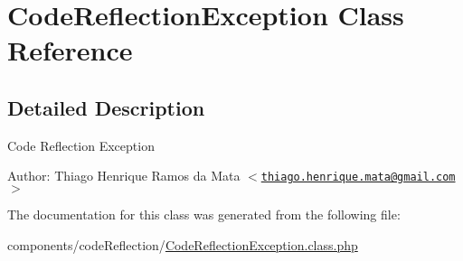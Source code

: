 \hypertarget{class_code_reflection_exception}{
\section{CodeReflectionException Class Reference}
\label{class_code_reflection_exception}
}


\subsection{Detailed Description}
Code Reflection Exception

\begin{Desc}
\item[Author:]Thiago Henrique Ramos da Mata $<$\href{mailto:thiago.henrique.mata@gmail.com}{\tt thiago.henrique.mata@gmail.com}$>$ \end{Desc}


The documentation for this class was generated from the following file:\begin{CompactItemize}
\item 
components/codeReflection/\hyperlink{_code_reflection_exception_8class_8php}{CodeReflectionException.class.php}\end{CompactItemize}
